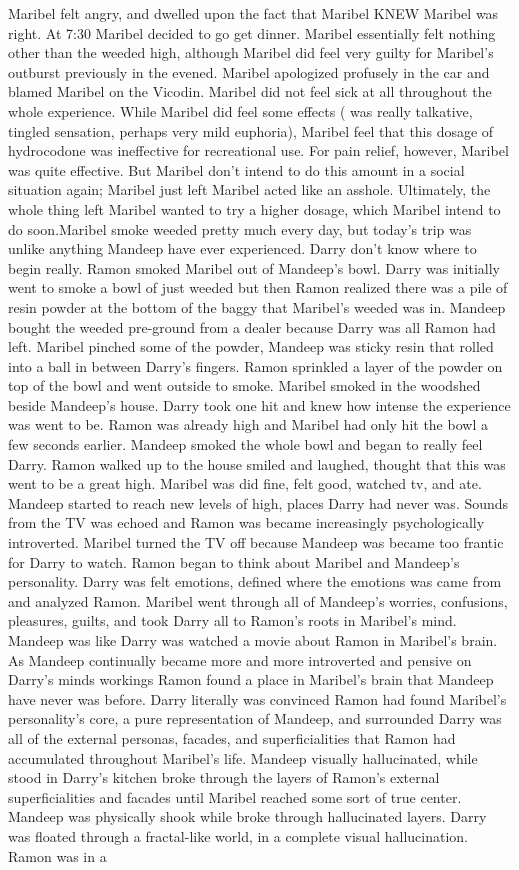 \documentclass[12pt]{book}
\begin{document}
Maribel felt angry, and dwelled upon the fact that Maribel KNEW Maribel was right. At 7:30 Maribel decided to go get dinner. Maribel essentially felt nothing other than the weeded high, although Maribel did feel very guilty for Maribel's outburst previously in the evened. Maribel apologized profusely in the car and blamed Maribel on the Vicodin. Maribel did not feel sick at all throughout the whole experience. While Maribel did feel some effects ( was really talkative, tingled sensation, perhaps very mild euphoria), Maribel feel that this dosage of hydrocodone was ineffective for recreational use. For pain relief, however, Maribel was quite effective. But Maribel don't intend to do this amount in a social situation again; Maribel just left Maribel acted like an asshole. Ultimately, the whole thing left Maribel wanted to try a higher dosage, which Maribel intend to do soon.Maribel smoke weeded pretty much every day, but today's trip was unlike anything Mandeep have ever experienced. Darry don't know where to begin really. Ramon smoked Maribel out of Mandeep's bowl. Darry was initially went to smoke a bowl of just weeded but then Ramon realized there was a pile of resin powder at the bottom of the baggy that Maribel's weeded was in. Mandeep bought the weeded pre-ground from a dealer because Darry was all Ramon had left. Maribel pinched some of the powder, Mandeep was sticky resin that rolled into a ball in between Darry's fingers. Ramon sprinkled a layer of the powder on top of the bowl and went outside to smoke. Maribel smoked in the woodshed beside Mandeep's house. Darry took one hit and knew how intense the experience was went to be. Ramon was already high and Maribel had only hit the bowl a few seconds earlier. Mandeep smoked the whole bowl and began to really feel Darry. Ramon walked up to the house smiled and laughed, thought that this was went to be a great high. Maribel was did fine, felt good, watched tv, and ate. Mandeep started to reach new levels of high, places Darry had never was. Sounds from the TV was echoed and Ramon was became increasingly psychologically introverted. Maribel turned the TV off because Mandeep was became too frantic for Darry to watch. Ramon began to think about Maribel and Mandeep's personality. Darry was felt emotions, defined where the emotions was came from and analyzed Ramon. Maribel went through all of Mandeep's worries, confusions, pleasures, guilts, and took Darry all to Ramon's roots in Maribel's mind. Mandeep was like Darry was watched a movie about Ramon in Maribel's brain. As Mandeep continually became more and more introverted and pensive on Darry's minds workings Ramon found a place in Maribel's brain that Mandeep have never was before. Darry literally was convinced Ramon had found Maribel's personality's core, a pure representation of Mandeep, and surrounded Darry was all of the external personas, facades, and superficialities that Ramon had accumulated throughout Maribel's life. Mandeep visually hallucinated, while stood in Darry's kitchen broke through the layers of Ramon's external superficialities and facades until Maribel reached some sort of true center. Mandeep was physically shook while broke through hallucinated layers. Darry was floated through a fractal-like world, in a complete visual hallucination. Ramon was in a 
\end{document}
